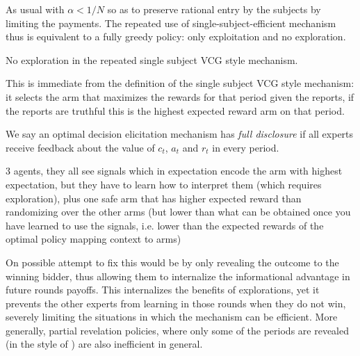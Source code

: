 As usual with $\alpha < 1/N$ so as to preserve rational entry by the subjects by limiting the payments.
The repeated use of single-subject-efficient mechanism thus is equivalent to a fully greedy policy: only exploitation and no exploration.

\begin{prop}
No exploration in the repeated single subject VCG style mechanism.
\end{prop}

This is immediate from the definition of the single subject VCG style mechanism: it selects the arm that maximizes the rewards for that period given the reports, if the reports are truthful this is the highest expected reward arm on that period. 

\begin{defn}
We say an optimal decision elicitation mechanism has \emph{full disclosure} if all experts receive feedback about the value of $c_t$, $a_t$ and $r_t$ in every period.
\end{defn}


\begin{eg}
3 agents, they all see signals which in expectation encode the arm with highest expectation, but they have to learn how to interpret them (which requires exploration), plus one safe arm that has higher expected reward than randomizing over the other arms (but lower than what can be obtained once you have learned to use the signals, i.e. lower than the expected rewards of the optimal policy mapping context to arms)
\end{eg}



On possible attempt to fix this would be by only revealing the outcome to the winning bidder, thus allowing them to internalize the informational advantage in future rounds payoffs. 
This  internalizes the benefits of explorations, yet it prevents the other experts from learning in those rounds when they do not win, severely limiting the situations in which the mechanism can be efficient. 
More generally, partial revelation policies, where only some of the periods are revealed (in the style of  \cite{mansour2015bayesian} ) are also inefficient in general. 
 

